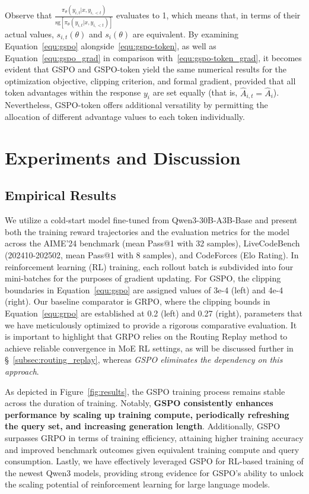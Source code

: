 Observe that $\frac{ \pi_{\theta} (y_{i,t} | x, y_{i,<t}) }{ \mathrm{sg} \left[ \pi_{\theta} (y_{i,t} | x, y_{i,<t}) \right] }$ evaluates to 1, which means that, in terms of their actual values, $s_{i,t}(\theta)$ and $s_{i}(\theta)$ are equivalent. By examining Equation~\eqref{equ:gspo} alongside~\eqref{equ:gspo-token}, as well as Equation~\eqref{equ:gspo_grad} in comparison with~\eqref{equ:gspo-token_grad}, it becomes evident that GSPO and GSPO-token yield the same numerical results for the optimization objective, clipping criterion, and formal gradient, provided that all token advantages within the response $y_i$ are set equally (that is, $\widehat{A}_{i,t} = \widehat{A}_{i}$). Nevertheless, GSPO-token offers additional versatility by permitting the allocation of different advantage values to each token individually.

\section{Experiments and Discussion}

\subsection{Empirical Results}

We utilize a cold-start model fine-tuned from Qwen3-30B-A3B-Base and present both the training reward trajectories and the evaluation metrics for the model across the AIME'24 benchmark (mean Pass@1 with 32 samples), LiveCodeBench (202410-202502, mean Pass@1 with 8 samples), and CodeForces (Elo Rating). In reinforcement learning (RL) training, each rollout batch is subdivided into four mini-batches for the purposes of gradient updating. For GSPO, the clipping boundaries in Equation~\eqref{equ:gspo} are assigned values of 3e-4 (left) and 4e-4 (right). Our baseline comparator is GRPO, where the clipping bounds in Equation~\eqref{equ:grpo} are established at 0.2 (left) and 0.27 (right), parameters that we have meticulously optimized to provide a rigorous comparative evaluation. It is important to highlight that GRPO relies on the Routing Replay method to achieve reliable convergence in MoE RL settings, as will be discussed further in \S~\ref{subsec:routing_replay}, whereas \textit{GSPO eliminates the dependency on this approach}.

As depicted in Figure~\ref{fig:results}, the GSPO training process remains stable across the duration of training. Notably, \textbf{GSPO consistently enhances performance by scaling up training compute, periodically refreshing the query set, and increasing generation length}. Additionally, GSPO surpasses GRPO in terms of training efficiency, attaining higher training accuracy and improved benchmark outcomes given equivalent training compute and query consumption. Lastly, we have effectively leveraged GSPO for RL-based training of the newest Qwen3 models, providing strong evidence for GSPO's ability to unlock the scaling potential of reinforcement learning for large language models.

